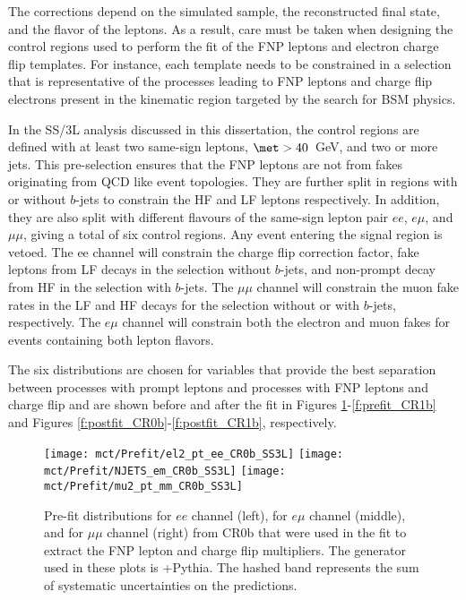 The corrections depend on the simulated sample,
the reconstructed final state, and the flavor of the leptons. As a result, care must be taken when designing the control regions 
used to perform the fit of the FNP leptons and electron charge flip templates. 
For instance, each template needs to be constrained in a selection that is representative of the processes leading to 
FNP leptons and charge flip electrons present in the kinematic region targeted by the search for BSM physics. 

In the SS/3L analysis discussed in this dissertation, the control regions are defined with at least two same-sign 
leptons, $\met>40$~GeV, and two or more jets. This pre-selection ensures that the FNP leptons are not from fakes originating from 
QCD like event topologies. 
They are further split in regions 
with or without $b$-jets to constrain the HF and LF leptons respectively. In addition, they are also split with different 
flavours of the same-sign lepton pair $ee$, $e\mu$, and $\mu\mu$, giving a total of six control regions. 
Any event entering the signal region is vetoed. The ee channel will constrain the charge flip correction factor, fake leptons 
 from LF decays in the selection without $b$-jets, and non-prompt decay from HF in the selection with $b$-jets. 
The $\mu\mu$ channel will constrain the muon fake rates in the LF and HF decays for the selection without or with $b$-jets, 
respectively. The $e\mu$ channel will constrain both the electron and muon fakes for events containing both lepton flavors. 

The six distributions are chosen for variables that provide the best separation between processes with prompt leptons and processes with FNP leptons and charge flip and are shown 
before and after the fit in Figures \ref{f:prefit_CR0b}-\ref{f:prefit_CR1b} and Figures \ref{f:postfit_CR0b}-\ref{f:postfit_CR1b}, respectively. 

 \begin{figure}[htb!]
   \texttt{[image: mct/Prefit/el2\_pt\_ee\_CR0b\_SS3L]}
   \texttt{[image: mct/Prefit/NJETS\_em\_CR0b\_SS3L]}
   \texttt{[image: mct/Prefit/mu2\_pt\_mm\_CR0b\_SS3L]}
 \caption{
 Pre-fit distributions for  $ee$ channel (left),  for  $e\mu$ channel (middle), and  for  $\mu\mu$ channel (right) from CR0b that were used in the fit to extract the FNP lepton and charge flip multipliers.
The generator used in these plots is  \POWHEGBOX+Pythia. The hashed band represents the sum of systematic uncertainties on the predictions.
 \label{f:prefit_CR0b}
 }
 \end{figure}

